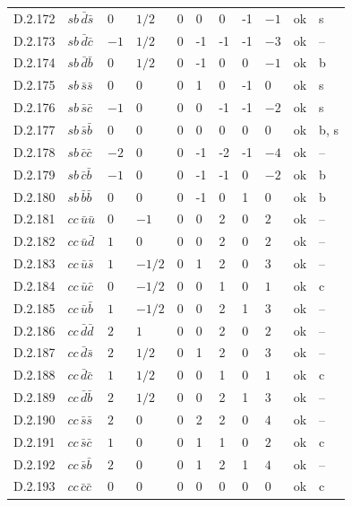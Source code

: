 {\begin{longtable}{@{}llllllllll>{\raggedright\arraybackslash}p{2.0cm}@{}}
D.2.172 & $sb\,\bar{d}\bar{s}$ & $0$ & $1/2$ & $0$ & 0 & 0 & -1 & $-1$ & ok & s \\
D.2.173 & $sb\,\bar{d}\bar{c}$ & $-1$ & $1/2$ & $0$ & -1 & -1 & -1 & $-3$ & ok & -- \\
D.2.174 & $sb\,\bar{d}\bar{b}$ & $0$ & $1/2$ & $0$ & -1 & 0 & 0 & $-1$ & ok & b \\
D.2.175 & $sb\,\bar{s}\bar{s}$ & $0$ & $0$ & $0$ & 1 & 0 & -1 & $0$ & ok & s \\
D.2.176 & $sb\,\bar{s}\bar{c}$ & $-1$ & $0$ & $0$ & 0 & -1 & -1 & $-2$ & ok & s \\
D.2.177 & $sb\,\bar{s}\bar{b}$ & $0$ & $0$ & $0$ & 0 & 0 & 0 & $0$ & ok & b, s \\
D.2.178 & $sb\,\bar{c}\bar{c}$ & $-2$ & $0$ & $0$ & -1 & -2 & -1 & $-4$ & ok & -- \\
D.2.179 & $sb\,\bar{c}\bar{b}$ & $-1$ & $0$ & $0$ & -1 & -1 & 0 & $-2$ & ok & b \\
D.2.180 & $sb\,\bar{b}\bar{b}$ & $0$ & $0$ & $0$ & -1 & 0 & 1 & $0$ & ok & b \\
D.2.181 & $cc\,\bar{u}\bar{u}$ & $0$ & $-1$ & $0$ & 0 & 2 & 0 & $2$ & ok & -- \\
D.2.182 & $cc\,\bar{u}\bar{d}$ & $1$ & $0$ & $0$ & 0 & 2 & 0 & $2$ & ok & -- \\
D.2.183 & $cc\,\bar{u}\bar{s}$ & $1$ & $-1/2$ & $0$ & 1 & 2 & 0 & $3$ & ok & -- \\
D.2.184 & $cc\,\bar{u}\bar{c}$ & $0$ & $-1/2$ & $0$ & 0 & 1 & 0 & $1$ & ok & c \\
D.2.185 & $cc\,\bar{u}\bar{b}$ & $1$ & $-1/2$ & $0$ & 0 & 2 & 1 & $3$ & ok & -- \\
D.2.186 & $cc\,\bar{d}\bar{d}$ & $2$ & $1$ & $0$ & 0 & 2 & 0 & $2$ & ok & -- \\
D.2.187 & $cc\,\bar{d}\bar{s}$ & $2$ & $1/2$ & $0$ & 1 & 2 & 0 & $3$ & ok & -- \\
D.2.188 & $cc\,\bar{d}\bar{c}$ & $1$ & $1/2$ & $0$ & 0 & 1 & 0 & $1$ & ok & c \\
D.2.189 & $cc\,\bar{d}\bar{b}$ & $2$ & $1/2$ & $0$ & 0 & 2 & 1 & $3$ & ok & -- \\
D.2.190 & $cc\,\bar{s}\bar{s}$ & $2$ & $0$ & $0$ & 2 & 2 & 0 & $4$ & ok & -- \\
D.2.191 & $cc\,\bar{s}\bar{c}$ & $1$ & $0$ & $0$ & 1 & 1 & 0 & $2$ & ok & c \\
D.2.192 & $cc\,\bar{s}\bar{b}$ & $2$ & $0$ & $0$ & 1 & 2 & 1 & $4$ & ok & -- \\
D.2.193 & $cc\,\bar{c}\bar{c}$ & $0$ & $0$ & $0$ & 0 & 0 & 0 & $0$ & ok & c \\

\end{longtable}}
